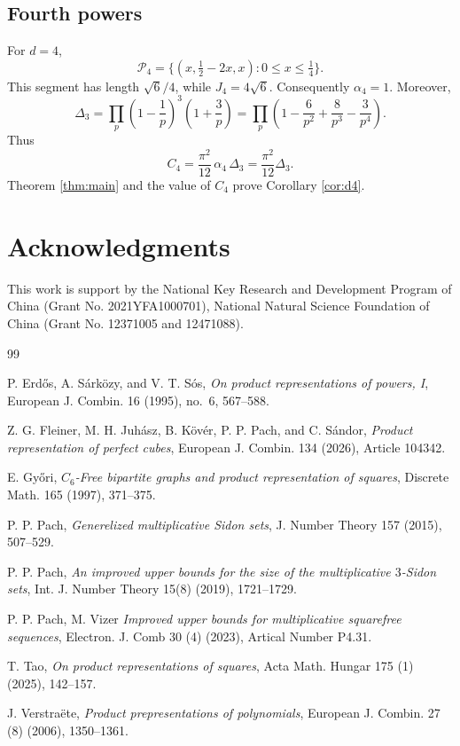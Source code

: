 \documentclass[12pt,a4paper,reqno]{amsart}
\numberwithin{equation}{section}
\newcommand{\cP}{\mathcal P}
\newcommand{\1}{\mathbf 1}
\theoremstyle{plain}
\theoremstyle{definition}
\begin{document}
\subsection{Fourth powers}
For $d=4$,
\[
 \cP_4=\{(x,\tfrac12-2x,x):0\leq x\leq\tfrac14\}.
\]
This segment has length $\sqrt6/4$, while $J_4=4\sqrt6$.
Consequently $\alpha_4=1$.  Moreover,
\[
 \Delta_3
 =\prod_p\left(1-\frac1p\right)^3\left(1+\frac3p\right)
 =\prod_p\left(1-\frac6{p^2}+\frac8{p^3}-\frac3{p^4}\right).
\]
Thus 
$$C_4=\frac{\pi^2}{12}\,\alpha_4\,\Delta_{3}=\frac{\pi^2}{12}\Delta_3.$$
Theorem \ref{thm:main} and the value of $C_4$ prove Corollary
\ref{cor:d4}.

\section*{Acknowledgments}
This work is support by the National Key Research and Development Program of China (Grant No. 2021YFA1000701), National Natural Science Foundation of China  (Grant No. 12371005 and 12471088).

\begin{thebibliography}{99}

P. Erd\H{o}s, A. S\'ark\"ozy, and V. T. S\'os,
{\it On product representations of powers, I},
{European J. Combin.} 16 (1995), no.~6, 567--588.

Z. G. Fleiner, M. H. Juh\'asz, B. K\"ov\'er, P. P. Pach, and
C. S\'andor,
{\it Product representation of perfect cubes},
{European J. Combin.} 134 (2026), Article 104342.

 E. Gy\H{o}ri, 
{\it $C_6$-Free bipartite graphs and product representation of squares},
{Discrete Math.} 165 (1997), 371--375.

 P. P. Pach, 
{\it Generelized multiplicative Sidon sets},
{J. Number Theory} 157 (2015), 507--529.

 P. P. Pach, 
{\it An improved upper bounds for the size of the multiplicative $3$-Sidon sets},
{Int. J. Number Theory} 15(8) (2019), 1721--1729.

 P. P. Pach, M. Vizer
{\it Improved upper bounds for multiplicative squarefree sequences},
{Electron. J. Comb} 30 (4) (2023), Artical Number P4.31.

 T. Tao,
{\it On product representations of squares},
{Acta Math. Hungar} 175 (1) (2025), 142--157.

J. Verstra\"ete,
{\it Product prepresentations of polynomials},
{European J. Combin.} 27 (8) (2006), 1350--1361.

\end{thebibliography}
\end{document}
